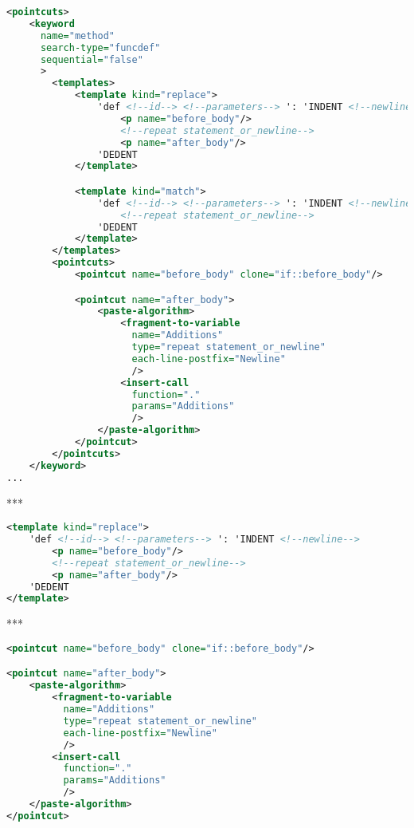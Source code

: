 \begin{lstlisting}[frame=single, language=XML, label={annotation-pointcuts-example}, caption={Пример}]
<pointcuts>
    <keyword
      name="method"
      search-type="funcdef"
      sequential="false"
      >
        <templates>
            <template kind="replace">
                'def <!--id--> <!--parameters--> ': 'INDENT <!--newline-->
                    <p name="before_body"/>
                    <!--repeat statement_or_newline-->
                    <p name="after_body"/>
                'DEDENT
            </template>

            <template kind="match">
                'def <!--id--> <!--parameters--> ': 'INDENT <!--newline-->
                    <!--repeat statement_or_newline-->
                'DEDENT
            </template>
        </templates>
        <pointcuts>
            <pointcut name="before_body" clone="if::before_body"/>

            <pointcut name="after_body">
                <paste-algorithm>
                    <fragment-to-variable
                      name="Additions"
                      type="repeat statement_or_newline"
                      each-line-postfix="Newline"
                      />
                    <insert-call
                      function="."
                      params="Additions"
                      />
                </paste-algorithm>
            </pointcut>
        </pointcuts>
    </keyword>
...
\end{lstlisting}

***

\begin{lstlisting}[frame=single, language=XML, label={annotation-template-example}, caption={Пример}]
<template kind="replace">
    'def <!--id--> <!--parameters--> ': 'INDENT <!--newline-->
        <p name="before_body"/>
        <!--repeat statement_or_newline-->
        <p name="after_body"/>
    'DEDENT
</template>
\end{lstlisting}

***

\begin{lstlisting}[frame=single, language=XML, label={annotation-algo-example}, caption={Пример}]
<pointcut name="before_body" clone="if::before_body"/>

<pointcut name="after_body">
    <paste-algorithm>
        <fragment-to-variable
          name="Additions"
          type="repeat statement_or_newline"
          each-line-postfix="Newline"
          />
        <insert-call
          function="."
          params="Additions"
          />
    </paste-algorithm>
</pointcut>
\end{lstlisting}

